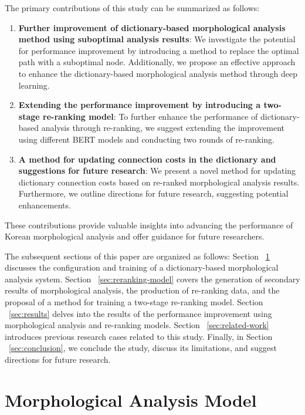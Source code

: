 \documentclass[AMS,STIX2COL]{WileyNJD-v2}
\begin{document}
    The primary contributions of this study can be summarized as follows:
    \begin{enumerate}
        \item \textbf{Further improvement of dictionary-based morphological analysis method using suboptimal analysis results}: We investigate the potential for performance improvement by introducing a method to replace the optimal path with a suboptimal node. Additionally, we propose an effective approach to enhance the dictionary-based morphological analysis method through deep learning.
        \item \textbf{Extending the performance improvement by introducing a two-stage re-ranking model}: To further enhance the performance of dictionary-based analysis through re-ranking, we suggest extending the improvement using different BERT models and conducting two rounds of re-ranking.
        \item \textbf{A method for updating connection costs in the dictionary and suggestions for future research}: We present a novel method for updating dictionary connection costs based on re-ranked morphological analysis results. Furthermore, we outline directions for future research, suggesting potential enhancements.
    \end{enumerate}
    These contributions provide valuable insights into advancing the performance of Korean morphological analysis and offer guidance for future researchers.

    The subsequent sections of this paper are organized as follows:
    Section ~\ref{sec:morphological-analysis-model} discusses the configuration and training of a dictionary-based morphological analysis system.
    Section ~\ref{sec:reranking-model} covers the generation of secondary results of morphological analysis, the production of re-ranking data, and the proposal of a method for training a two-stage re-ranking model.
    Section ~\ref{sec:results} delves into the results of the performance improvement using morphological analysis and re-ranking models.
    Section ~\ref{sec:related-work} introduces previous research cases related to this study.
    Finally, in Section ~\ref{sec:conclusion}, we conclude the study, discuss its limitations, and suggest directions for future research.


    \section{Morphological Analysis Model}\label{sec:morphological-analysis-model}
\end{document}
